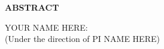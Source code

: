 \documentclass[crop=false,12pt,class=report]{standalone}
\begin{document}
\begin{center}
    \textbf{\uppercase{abstract}}
    \begin{singlespacing}
        {\color{red} YOUR NAME HERE}: \mytitle\\
        (Under the direction of {\color{red} PI NAME HERE})\\
    \end{singlespacing}
    \end{center}

\begin{doublespacing}
    \lipsum[1-3]
\end{doublespacing}

\setcounter{page}{3}
\restoregeometry
\end{document}
